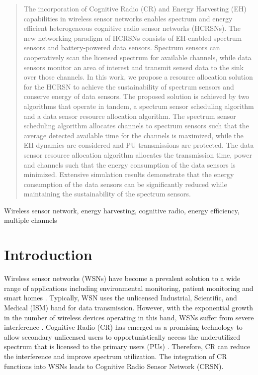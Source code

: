 \documentclass[journal]{IEEEtran} \ifCLASSINFOpdf
\begin{document}
\maketitle
\begin{abstract}
The incorporation of Cognitive Radio (CR) and Energy Harvesting (EH) capabilities in wireless sensor networks enables spectrum and energy efficient heterogeneous cognitive radio sensor networks (HCRSNs). The new networking paradigm of HCRSNs consists of EH-enabled spectrum sensors and battery-powered data sensors. Spectrum sensors can cooperatively scan the licensed spectrum for available channels, while data sensors monitor an area of interest and transmit sensed data to the sink over those channels. In this work, we propose a resource allocation solution for the HCRSN to achieve the sustainability of spectrum sensors and conserve energy of data sensors. The proposed solution is achieved by two algorithms that operate in tandem, a spectrum sensor scheduling algorithm and a data sensor resource allocation algorithm. The spectrum sensor scheduling algorithm allocates channels to spectrum sensors such that the average detected available time for the channels is maximized, while the EH dynamics are considered and PU transmissions are protected. The data sensor resource allocation algorithm allocates the transmission time, power and channels such that the energy consumption of the data sensors is minimized. Extensive simulation results demonstrate that the energy consumption of the data sensors can be significantly reduced while maintaining the sustainability of the spectrum sensors.
\end{abstract}
\begin{IEEEkeywords}
Wireless sensor network, energy harvesting, cognitive radio, energy efficiency, multiple channels
\end{IEEEkeywords}
\IEEEpeerreviewmaketitle
\section{Introduction}
Wireless sensor networks (WSNs) have become a prevalent solution to a wide range of applications including environmental monitoring, patient monitoring and smart homes \cite{Borges2014}. Typically, WSN uses the unlicensed Industrial, Scientific, and Medical (ISM) band for data transmission. However, with the exponential growth in the number of wireless devices operating in this band, WSNs suffer from severe interference \cite{Akan2009}. Cognitive Radio (CR) has emerged as a promising technology to allow secondary unlicensed users to opportunistically access the underutilized spectrum that is licensed to the primary users (PUs) \cite{Zhang2014}. Therefore, CR can reduce the interference and improve spectrum utilization. The integration of CR functions into WSNs leads to Cognitive Radio Sensor Network (CRSN).
\end{document}

